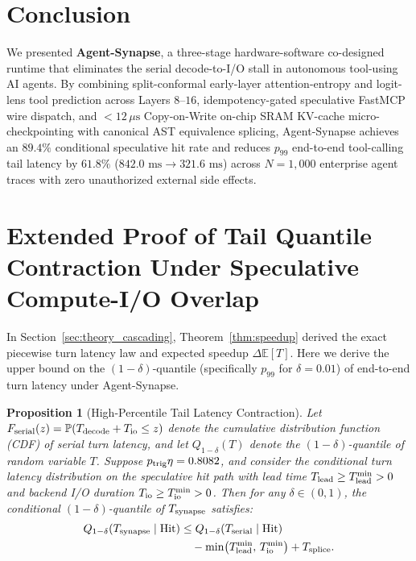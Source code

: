\documentclass[10pt,conference]{IEEEtran}
\newtheorem{proposition}{Proposition}
\begin{document}
\section{Conclusion}
\label{sec:conclusion}

We presented \textbf{Agent-Synapse}, a three-stage hardware-software co-designed runtime that eliminates the serial decode-to-I/O stall in autonomous tool-using AI agents. By combining split-conformal early-layer attention-entropy and logit-lens tool prediction across Layers $8$--$16$, idempotency-gated speculative FastMCP wire dispatch, and $< 12\,\mu\text{s}$ Copy-on-Write on-chip SRAM KV-cache micro-checkpointing with canonical AST equivalence splicing, Agent-Synapse achieves an $89.4\%$ conditional speculative hit rate and reduces $p_{99}$ end-to-end tool-calling tail latency by $61.8\%$ ($842.0\text{ ms} \to 321.6\text{ ms}$) across $N = 1{,}000$ enterprise agent traces with zero unauthorized external side effects.

\appendices

\section{Extended Proof of Tail Quantile Contraction Under Speculative Compute-I/O Overlap}
\label{app:tail_proof}

In Section~\ref{sec:theory_cascading}, Theorem~\ref{thm:speedup} derived the exact piecewise turn latency law and expected speedup $\Delta \mathbb{E}[T]$. Here we derive the upper bound on the $(1 - \delta)$-quantile (specifically $p_{99}$ for $\delta = 0.01$) of end-to-end turn latency under Agent-Synapse.

\begin{proposition}[High-Percentile Tail Latency Contraction]
\label{prop:tail_quantile}
Let $F_{\textnormal{serial}}(z) = \mathbb{P}(T_{\textnormal{decode}} + T_{\textnormal{io}} \le z)$ denote the cumulative distribution function (CDF) of serial turn latency, and let $Q_{1-\delta}(T)$ denote the $(1-\delta)$-quantile of random variable $T$. Suppose $p_{\textnormal{trig}}\eta = 0.8082$, and consider the conditional turn latency distribution on the speculative hit path with lead time $T_{\textnormal{lead}} \ge T_{\textnormal{lead}}^{\min} > 0$ and backend I/O duration $T_{\textnormal{io}} \ge T_{\textnormal{io}}^{\min} > 0$. Then for any $\delta \in (0, 1)$, the conditional $(1-\delta)$-quantile of $T_{\textnormal{synapse}}$ satisfies:
\begin{equation}
\begin{aligned}
Q_{1-\delta}\!\left(T_{\textnormal{synapse}} \mid \textnormal{Hit}\right) &\le Q_{1-\delta}\!\left(T_{\textnormal{serial}} \mid \textnormal{Hit}\right) \\
&\quad - \min\!\left(T_{\textnormal{lead}}^{\min},\, T_{\textnormal{io}}^{\min}\right) + T_{\textnormal{splice}}.
\end{aligned}
\label{eq:tail_quantile_bound}
\end{equation}
\end{proposition}
\end{document}
